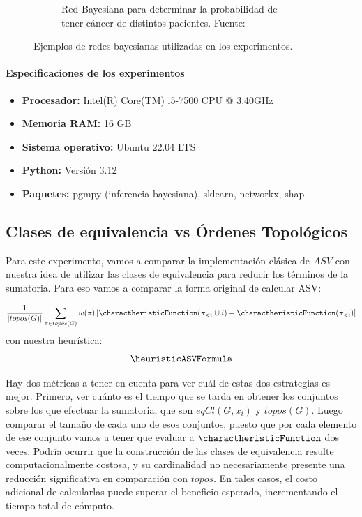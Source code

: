 \begin{figure}[ht]
\begin{subfigure}[b]{0.6\textwidth}
        \caption{Red Bayesiana \cancerNetwork para determinar la probabilidad de tener cáncer de distintos pacientes. Fuente: \cite{childNetwork}}
        \label{fig:child_network}
    \end{subfigure}

    \caption{Ejemplos de redes bayesianas utilizadas en los experimentos.}
    \label{fig:bayesian_networks_combined}
\end{figure}

\paragraph{Especificaciones de los experimentos}

\begin{itemize}
    \item \textbf{Procesador:} Intel(R) Core(TM) i5-7500 CPU @ 3.40GHz
    \item \textbf{Memoria RAM:} 16 GB
    \item \textbf{Sistema operativo:} Ubuntu 22.04 LTS
    \item \textbf{Python:} Versión 3.12
    \item  \textbf{Paquetes:} pgmpy (inferencia bayesiana), sklearn, networkx, shap
\end{itemize}

\subsection{Clases de equivalencia vs Órdenes Topológicos}

Para este experimento, vamos a comparar la implementación clásica de $ASV$ con nuestra idea de utilizar las clases de equivalencia para reducir los términos de la sumatoria. Para eso vamos a comparar la forma original de calcular ASV: 

$$\frac{1}{|topos(G)|} \sum_{\pi \in topos(G)} w(\pi) \left[ \charactheristicFunction(\pi_{<i} \cup {i}) - \charactheristicFunction(\pi_{<i}) \right] $$
con nuestra heurística:
$$\heuristicASVFormula$$

Hay dos métricas a tener en cuenta para ver cuál de estas dos estrategias es mejor. Primero, ver cuánto es el tiempo que se tarda en obtener los conjuntos sobre los que efectuar la sumatoria, que son $eqCl(G, x_i)$ y $topos(G)$. Luego comparar el tamaño de cada uno de esos conjuntos, puesto que por cada elemento de ese conjunto vamos a tener que evaluar a $\charactheristicFunction$ dos veces. Podría ocurrir que la construcción de las clases de equivalencia resulte computacionalmente costosa, y su cardinalidad no necesariamente presente una reducción significativa en comparación con $topos$. En tales casos, el costo adicional de calcularlas puede superar el beneficio esperado, incrementando el tiempo total de cómputo.

